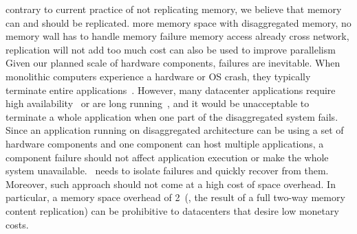 \documentclass[10pt,times,twocolumn]{z2-article}
\begin{document}
contrary to current practice of not replicating memory, we believe that memory can and should be replicated. 
more memory space with disaggregated memory, no memory wall
has to handle memory failure
memory access already cross network, replication will not add too much cost
can also be used to improve parallelism
Given our planned scale of hardware components, failures are inevitable.
When monolithic computers experience a hardware or OS crash, they typically terminate entire applications~\cite{Depoutovitch10-otherworld}.
However, many datacenter applications require high availability~\cite{MongoDB} or are long running~\cite{TensorFlow},
and it would be unacceptable to terminate a whole application when one part of the disaggregated system fails.
Since an application running on disaggregated architecture
can be using a set of hardware components and one component can host multiple applications, 
a component failure should not affect application execution or make the whole system unavailable.
\splitkernel\ needs to isolate failures and quickly recover from them. %
Moreover, such approach should not come at a high cost of space overhead.
In particular, a memory space overhead of 2\x\ (\eg, the result of a full two-way memory content replication) 
can be prohibitive to datacenters that desire low monetary costs.
\fi



\end{document}
